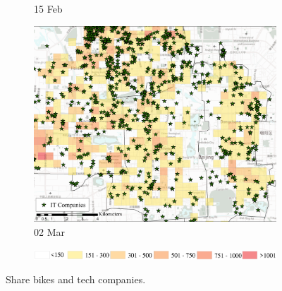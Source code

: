 \documentclass[preprints,article,accept,moreauthors,pdftex]{Definitions/mdpi}
\begin{document}
\begin{figure}[H]
\begin{subfigure}{.32\textwidth}
        \caption{15 Feb}
    \end{subfigure}
    \begin{subfigure}{.32\textwidth}
        \includegraphics[width=\textwidth]{Figures/Relation_with_POIs/POIsITD2020_03_02.pdf}
        \caption{02 Mar}
    \end{subfigure}

    \vspace{6pt}
    \begin{subfigure}{.7\textwidth}
        \includegraphics[width=\textwidth]{Figures/AppendixLegend2.eps}
    \end{subfigure}
    \caption{Share bikes and tech companies.}
    \label{fig:BSS_companies}
\end{figure}





\end{document}

